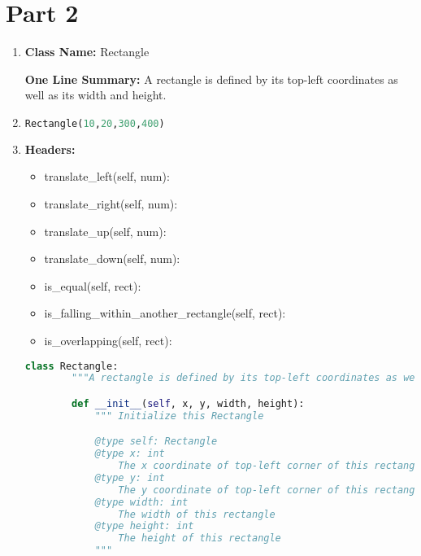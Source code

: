 \documentclass[12pt]{article}
\begin{document}
\section*{Part 2}
\begin{enumerate}
    \item

    \textbf{Class Name:} Rectangle

    \bigskip

    \textbf{One Line Summary:} A rectangle is defined by its top-left coordinates
    as well as its width and height.

    \item

    \begin{lstlisting}[language=Python]
    Rectangle(10,20,300,400)
    \end{lstlisting}

    \item

    \textbf{Headers:}

    \bigskip

    \begin{itemize}
        \item translate\_left(self, num):
        \item translate\_right(self, num):
        \item translate\_up(self, num):
        \item translate\_down(self, num):
        \item is\_equal(self, rect):
        \item is\_falling\_within\_another\_rectangle(self, rect):
        \item is\_overlapping(self, rect):
    \end{itemize}

    \begin{lstlisting}[language=Python]
    class Rectangle:
        """A rectangle is defined by its top-left coordinates as well as its width and height."""

        def __init__(self, x, y, width, height):
            """ Initialize this Rectangle

            @type self: Rectangle
            @type x: int
                The x coordinate of top-left corner of this rectangle
            @type y: int
                The y coordinate of top-left corner of this rectangle
            @type width: int
                The width of this rectangle
            @type height: int
                The height of this rectangle
            """


\end{lstlisting}
\end{enumerate}
\end{document}

